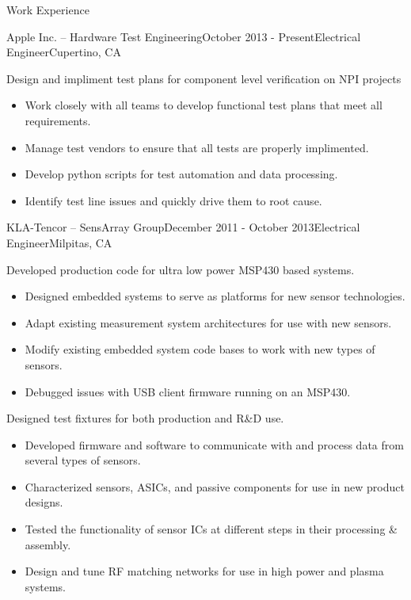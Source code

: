 \documentclass{resume} %
\begin{document}
\begin{rSection}{Work Experience}

\begin{rSubsection}{Apple Inc. -- Hardware Test Engineering}{October 2013 - Present}{Electrical Engineer}{Cupertino, CA}
\smallskip

\item Design and impliment test plans for component level verification on NPI projects
\begin{itemize}
\itemsep -0.5em \vspace{-0.5em}
\renewcommand{\labelitemi}{-}
\item Work closely with all teams to develop functional test plans that meet all requirements.
\item Manage test vendors to ensure that all tests are properly implimented.
\item Develop python scripts for test automation and data processing.
\item Identify test line issues and quickly drive them to root cause.
\end{itemize}
\medskip
\end{rSubsection}


\begin{rSubsection}{KLA-Tencor -- SensArray Group}{December 2011 - October 2013}{Electrical Engineer}{Milpitas, CA}
\smallskip

\item Developed production code for ultra low power MSP430 based systems.
\begin{itemize}
\itemsep -0.5em \vspace{-0.5em}
\renewcommand{\labelitemi}{-}
\item Designed embedded systems to serve as platforms for new sensor technologies.
\item Adapt existing measurement system architectures for use with new sensors.
\item Modify existing embedded system code bases to work with new types of sensors.
\item Debugged issues with USB client firmware running on an MSP430.
\end{itemize}
\medskip

\item Designed test fixtures for both production and R\&D use.
\begin{itemize}
\itemsep -0.5em \vspace{-0.5em}
\renewcommand{\labelitemi}{-}
\item Developed firmware and software to communicate with and process data from several types of sensors.
\item Characterized sensors, ASICs, and passive components for use in new product designs.
\item Tested the functionality of sensor ICs at different steps in their processing \& assembly.
\item Design and tune RF matching networks for use in high power and plasma systems.
\end{itemize}
\medskip


\end{rSubsection}
\end{rSection}
\end{document}
